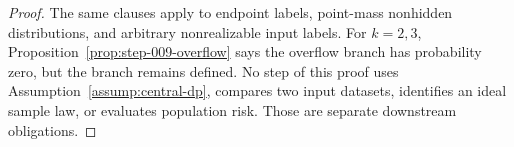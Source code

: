 \begin{proof}
The same clauses apply to endpoint labels, point-mass nonhidden
distributions, and arbitrary nonrealizable input labels. For \(k=2,3\),
Proposition~\ref{prop:step-009-overflow} says the overflow branch
has probability zero, but the branch remains defined. No step of this proof
uses Assumption~\ref{assump:central-dp}, compares two input datasets,
identifies an ideal sample law, or evaluates population risk. Those are
separate downstream obligations.
\end{proof}
